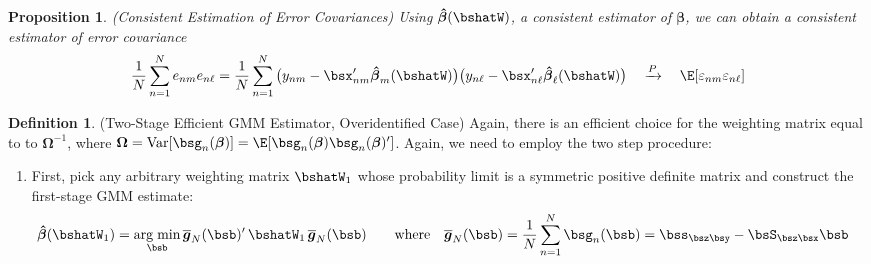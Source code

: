 \documentclass[12pt]{article}
\theoremstyle{plain}
\newtheorem{prop}[thm]{Proposition}
\theoremstyle{definition}
\newtheorem{defn}[thm]{Definition}
\theoremstyle{remark}
\newcommand{\bsbeta}{\boldsymbol{\beta}}
\newcommand{\bsOmega}{\boldsymbol{\Omega}}
\newcommand{\bshatbeta}{\boldsymbol{\hat{\beta}}}
\newcommand{\bsbarg}{\boldsymbol{\overline{g}}}
\DeclareMathOperator*{\argmin}{arg\;min}
\newcommand{\Var}{\operatorname{Var}}
\newcommand{\pto}{\xrightarrow{P}}
\newcommand{\sumnN}{\sum^N_{n=1}}
\begin{document}
\clearpage
\begin{prop}\emph{(Consistent Estimation of Error Covariances)}
Using $\bshatbeta(\bshatW)$, a consistent estimator of $\bsbeta$, we can
obtain a consistent estimator of error covariance
\begin{align*}
  \frac{1}{N} \sumnN e_{nm}e_{n\ell}
  =
  \frac{1}{N} \sumnN
  \big(y_{nm} - \bsx_{nm}'\bshatbeta_{m}(\bshatW)\big)
  \big(y_{n\ell} - \bsx_{n\ell}'\bshatbeta_{\ell}(\bshatW)\big)
  \quad\pto\quad
  \E[\varepsilon_{nm}\varepsilon_{n\ell}]
\end{align*}
\end{prop}

\begin{defn}(Two-Stage Efficient GMM Estimator, Overidentified Case)
Again, there is an efficient choice for the weighting matrix equal to to
$\bsOmega^{-1}$, where
$\bsOmega=\Var[\bsg_n(\bsbeta)]=\E[\bsg_n(\bsbeta)\bsg_n(\bsbeta)']$.
Again, we need to employ the two step procedure:
\begin{enumerate}[label=(\roman*)]
  \item First, pick any arbitrary weighting matrix $\bshatW_1$ whose
    probability limit is a symmetric positive definite matrix and
    construct the first-stage GMM estimate:
    \begin{align*}
      \bshatbeta(\bshatW_1) &=
      \argmin_{\bsb}
      \bsbarg_N(\bsb)' \, \bshatW_1 \, \bsbarg_N(\bsb)
      \qquad
      \text{where}\quad
      \bsbarg_N(\bsb)
      = \frac{1}{N} \sumnN \bsg_n(\bsb)
      = \bss_{\bsz\bsy} - \bsS_{\bsz\bsx}\bsb
    \end{align*}


\end{enumerate}
\end{defn}
\end{document}
